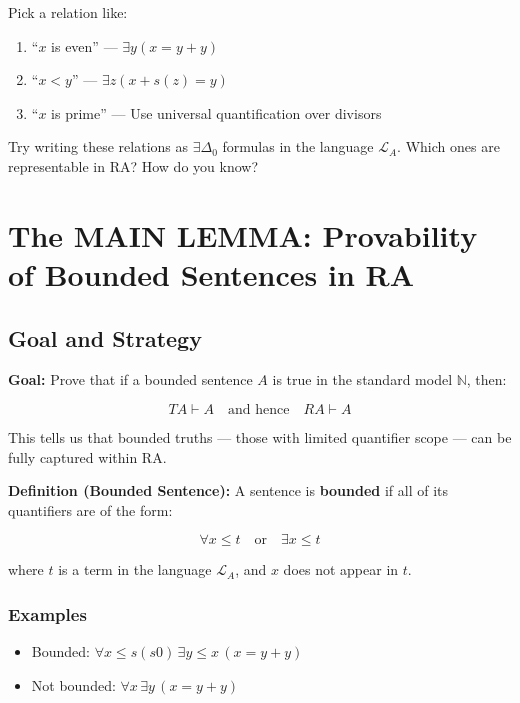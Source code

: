 \documentclass[12pt]{article}
\begin{document}
Pick a relation like:

\begin{enumerate}
  \item “\( x \) is even” — \( \exists y(x = y + y) \)
  \item “\( x < y \)” — \( \exists z(x + s(z) = y) \)
  \item “\( x \) is prime” — Use universal quantification over divisors
\end{enumerate}

Try writing these relations as \( \exists \Delta_0 \) formulas in the language \( \mathcal{L}_A \). Which ones are representable in RA? How do you know?

\section{The MAIN LEMMA: Provability of Bounded Sentences in RA}

\subsection{Goal and Strategy}

\textbf{Goal:} Prove that if a bounded sentence \( A \) is true in the standard model \( \mathbb{N} \), then:

\[
TA \vdash A \quad \text{and hence} \quad RA \vdash A
\]

This tells us that bounded truths — those with limited quantifier scope — can be fully captured within RA.

\textbf{Definition (Bounded Sentence):} A sentence is \textbf{bounded} if all of its quantifiers are of the form:

\[
\forall x \leq t \quad \text{or} \quad \exists x \leq t
\]

where \( t \) is a term in the language \( \mathcal{L}_A \), and \( x \) does not appear in \( t \).

\subsubsection*{Examples}

\begin{itemize}
  \item Bounded: \( \forall x \leq s(s0)\, \exists y \leq x\, (x = y + y) \)
  \item Not bounded: \( \forall x\, \exists y\, (x = y + y) \)
\end{itemize}
\end{document}
